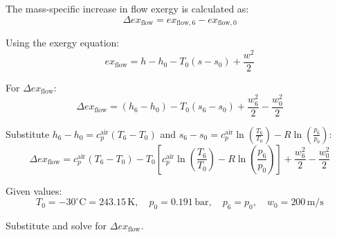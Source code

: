 The mass-specific increase in flow exergy is calculated as:  
\[
\Delta ex_{\text{flow}} = ex_{\text{flow},6} - ex_{\text{flow},0}
\]  

Using the exergy equation:  
\[
ex_{\text{flow}} = h - h_0 - T_0 (s - s_0) + \frac{w^2}{2}
\]  

For \( \Delta ex_{\text{flow}} \):  
\[
\Delta ex_{\text{flow}} = (h_6 - h_0) - T_0 (s_6 - s_0) + \frac{w_6^2}{2} - \frac{w_0^2}{2}
\]  

Substitute \( h_6 - h_0 = c_p^{\text{air}} (T_6 - T_0) \) and \( s_6 - s_0 = c_p^{\text{air}} \ln \left( \frac{T_6}{T_0} \right) - R \ln \left( \frac{p_6}{p_0} \right) \):  
\[
\Delta ex_{\text{flow}} = c_p^{\text{air}} (T_6 - T_0) - T_0 \left[ c_p^{\text{air}} \ln \left( \frac{T_6}{T_0} \right) - R \ln \left( \frac{p_6}{p_0} \right) \right] + \frac{w_6^2}{2} - \frac{w_0^2}{2}
\]  

Given values:  
\[
T_0 = -30^\circ\text{C} = 243.15 \, \text{K}, \quad p_0 = 0.191 \, \text{bar}, \quad p_6 = p_0, \quad w_0 = 200 \, \text{m/s}
\]  

Substitute and solve for \( \Delta ex_{\text{flow}} \).